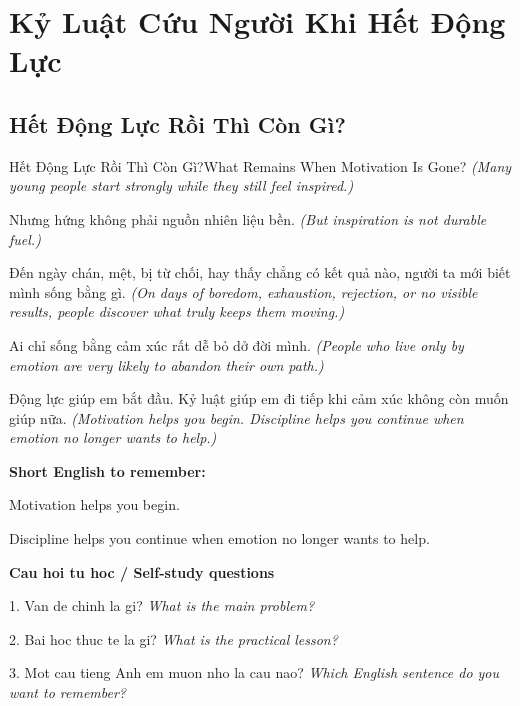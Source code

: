 \chapter{Kỷ Luật Cứu Người Khi Hết Động Lực}

\section{Hết Động Lực Rồi Thì Còn Gì?}
\begin{truyen}{Hết Động Lực Rồi Thì Còn Gì?}{What Remains When Motivation Is Gone?}
\textit{(Many young people start strongly while they still feel inspired.)}

Nhưng hứng không phải nguồn nhiên liệu bền.
\textit{(But inspiration is not durable fuel.)}

Đến ngày chán, mệt, bị từ chối, hay thấy chẳng có kết quả nào, người ta mới biết mình sống bằng gì.
\textit{(On days of boredom, exhaustion, rejection, or no visible results, people discover what truly keeps them moving.)}

Ai chỉ sống bằng cảm xúc rất dễ bỏ dở đời mình.
\textit{(People who live only by emotion are very likely to abandon their own path.)}

\end{truyen}

\begin{baihoc}
Động lực giúp em bắt đầu. Kỷ luật giúp em đi tiếp khi cảm xúc không còn muốn giúp nữa.
\textit{(Motivation helps you begin. Discipline helps you continue when emotion no longer wants to help.)}
\end{baihoc}

\begin{ghinhoanh}
\textbf{Short English to remember:}

Motivation helps you begin.

Discipline helps you continue when emotion no longer wants to help.

\end{ghinhoanh}

\begin{tuhocnhanh}
\textbf{Cau hoi tu hoc / Self-study questions}

1. Van de chinh la gi? \textit{What is the main problem?}

2. Bai hoc thuc te la gi? \textit{What is the practical lesson?}

3. Mot cau tieng Anh em muon nho la cau nao? \textit{Which English sentence do you want to remember?}
\end{tuhocnhanh}
\ngancach

